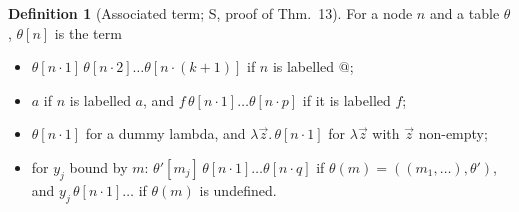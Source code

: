 \documentclass[11pt]{article}
\newcommand{\suc}[2]{#1{\cdot}#2}
\theoremstyle{plain}
\theoremstyle{definition}
\newtheorem{definition}[theorem]{Definition}
\theoremstyle{remark}
\begin{document}
\begin{definition}[Associated term; S, proof of Thm.~13]\label{def:assoc}
For a node $n$ and a table $\theta$, $\theta[n]$ is the term
\begin{itemize}
\item $\theta[\suc n1]\,\theta[\suc n2]\dots\theta[\suc n{(k+1)}]$ if $n$ is
  labelled $@$;
\item $a$ if $n$ is labelled $a$, and $f\,\theta[\suc n1]\dots\theta[\suc np]$
  if it is labelled $f$;
\item $\theta[\suc n1]$ for a dummy lambda, and
  $\lambda\vec z.\,\theta[\suc n1]$ for $\lambda\vec z$ with $\vec z$
  non-empty;
\item for $y_j$ bound by $m$: $\theta'[m_j]\,\theta[\suc n1]\dots\theta[\suc nq]$
  if $\theta(m)=((m_1,\dots),\theta')$, and $y_j\,\theta[\suc n1]\dots$
  if $\theta(m)$ is undefined.
\end{itemize}
\end{definition}
\end{document}
